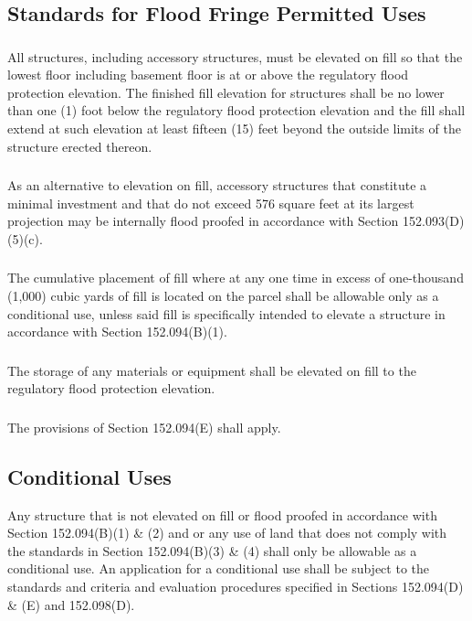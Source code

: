 \subsection{Standards for Flood Fringe Permitted Uses}
\subsubsection{}
All structures, including accessory structures, must be elevated on fill so that the lowest floor including basement floor is at or above the regulatory flood protection elevation. The finished fill elevation for structures shall be no lower than one (1) foot below the regulatory flood protection elevation and the fill shall extend at such elevation at least fifteen (15) feet beyond the outside limits of the structure erected thereon.
\subsubsection{}
As an alternative to elevation on fill, accessory structures that constitute a minimal investment and that do not exceed 576 square feet at its largest projection may be internally flood proofed in accordance with Section 152.093(D)(5)(c).
\subsubsection{}
The cumulative placement of fill where at any one time in excess of one-thousand (1,000) cubic yards of fill is located on the parcel shall be allowable only as a conditional use, unless said fill is specifically intended to elevate a structure in accordance with Section 152.094(B)(1).
\subsubsection{}
The storage of any materials or equipment shall be elevated on fill to the regulatory flood protection elevation.
\subsubsection{}
The provisions of Section 152.094(E) shall apply.
\subsection{Conditional Uses}
Any structure that is not elevated on fill or flood proofed in accordance with Section 152.094(B)(1) \& (2) and or any use of land that does not comply with the standards in Section 152.094(B)(3) \& (4) shall only be allowable as a conditional use. An application for a conditional use shall be subject to the standards and criteria and evaluation procedures specified in Sections 152.094(D) \& (E) and 152.098(D).
